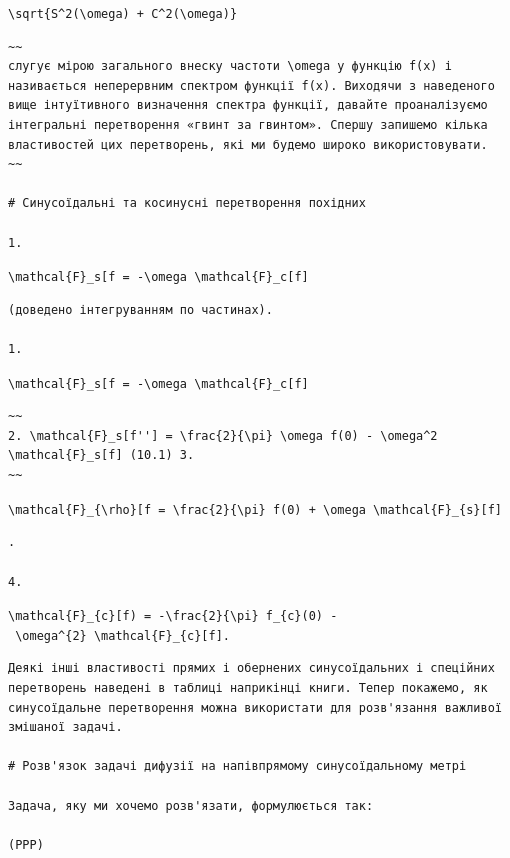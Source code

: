 \documentclass[
  ukrainian,
]{article}
\begin{document}
\texttt{\textbackslash{}sqrt\{S\^{}2(\textbackslash{}omega)\ +\ C\^{}2(\textbackslash{}omega)\}}

\begin{verbatim}
~~
слугує мірою загального внеску частоти \omega у функцію f(x) і називається неперервним спектром функції f(x). Виходячи з наведеного вище інтуїтивного визначення спектра функції, давайте проаналізуємо інтегральні перетворення «гвинт за гвинтом». Спершу запишемо кілька властивостей цих перетворень, які ми будемо широко використовувати.
~~

# Синусоїдальні та косинусні перетворення похідних

1.
\end{verbatim}

\texttt{\textbackslash{}mathcal\{F\}\_s{[}f\textquotesingle{}{]}\ =\ -\textbackslash{}omega\ \textbackslash{}mathcal\{F\}\_c{[}f{]}}

\begin{verbatim}
(доведено інтегруванням по частинах).

1.
\end{verbatim}

\texttt{\textbackslash{}mathcal\{F\}\_s{[}f\textquotesingle{}{]}\ =\ -\textbackslash{}omega\ \textbackslash{}mathcal\{F\}\_c{[}f{]}}

\begin{verbatim}
~~
2. \mathcal{F}_s[f''] = \frac{2}{\pi} \omega f(0) - \omega^2 \mathcal{F}_s[f] (10.1) 3.
~~
\end{verbatim}

\texttt{\textbackslash{}mathcal\{F\}\_\{\textbackslash{}rho\}{[}f\textquotesingle{}{]}\ =\ \textbackslash{}frac\{2\}\{\textbackslash{}pi\}\ f(0)\ +\ \textbackslash{}omega\ \textbackslash{}mathcal\{F\}\_\{s\}{[}f{]}}

\begin{verbatim}
.

4.
\end{verbatim}

\texttt{\textbackslash{}mathcal\{F\}\_\{c\}{[}f\textquotesingle{}\textquotesingle{})\ =\ -\textbackslash{}frac\{2\}\{\textbackslash{}pi\}\ f\_\{c\}(0)\ -\ \textbackslash{}omega\^{}\{2\}\ \textbackslash{}mathcal\{F\}\_\{c\}{[}f{]}.}

\begin{verbatim}
Деякі інші властивості прямих і обернених синусоїдальних і спеційних перетворень наведені в таблиці наприкінці книги. Тепер покажемо, як синусоїдальне перетворення можна використати для розв'язання важливої змішаної задачі.

# Розв'язок задачі дифузії на напівпрямому синусоїдальному метрі

Задача, яку ми хочемо розв'язати, формулюється так:

(PPP)
\end{verbatim}
\end{document}
